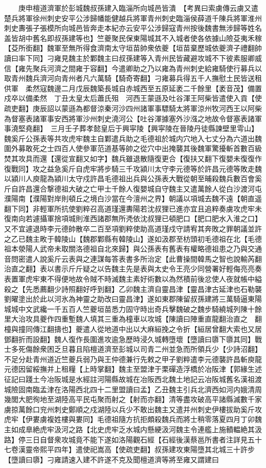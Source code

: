 　　庚申檀道濟軍於彭城魏叔孫建入臨淄所向城邑皆潰　【考異曰索虜傳云虜又遣楚兵將軍徐州刺史安平公涉歸幡能健越兵將軍青州刺史臨淄侯薛道千陳兵將軍淮州刺史夀張子張模所向城邑皆奔走本紀亦云安平公涉歸寇青州按後魏書無涉歸等姓名盖皆胡中舊名即叔孫建等也】竺夔聚民保東陽城其不入城者使各依據山險芟夷禾稼【芟所銜翻】魏軍至無所得食濟南太守垣苗帥衆依夔【垣苗棄歷城依夔濟子禮翻帥讀曰率下同】刁雍見魏主於鄴魏主曰叔孫建等入青州民皆藏避攻城不下彼素服卿威信【雍先聚兵河濟之間雍于容翻】今遣卿助之乃以雍為青州刺史給雍騎使行募兵以取青州魏兵濟河向青州者凡六萬騎【騎奇寄翻】刁雍募兵得五千人撫慰土民皆送租供軍　柔然寇魏邊二月戊辰魏築長城自赤城西至五原延袤二千餘里【袤音茂】備置戍卒以備柔然　丁丑太皇太后蕭氏殂　河西王蒙遜及吐谷渾王阿柴皆遣使入貢【使疏吏翻】庚辰詔以蒙遜為都督涼秦河沙四州諸軍事驃騎太將軍涼州牧河西王以阿柴為督塞表諸軍事安西將軍沙州刺史澆河公【吐谷渾據塞外沙漒之地故令督塞表諸軍事澆堅堯翻】　三月壬子葬孝懿皇后于興寜陵【興寜陵在晉陵丹徒縣諫壁里雩山】　魏奚斤公孫表等共攻虎牢魏主自鄴遣兵助之毛德祖於城内穴地入七丈分為六道出魏圍外募敢死之士四百人使參軍范道基等帥之從穴中出掩襲其後魏軍驚擾斬首數百級焚其攻具而還【還從宣翻又如字】魏兵雖退散隨復更合【復扶又翻下復嬰未復復作復戰同】攻之益急奚斤自虎牢將步騎三千攻潁川太守李元德等於許昌元德等敗走魏以潁川人庾龍為潁川太守戍許昌毛德祖出兵與公孫表大戰從朝至晡殺魏兵數百會奚斤自許昌還合撃德祖大破之亡甲士千餘人復嬰城自守魏主又遣萬餘人從白沙渡河屯濮陽南【濮陽對岸則頓丘之境白沙當在今澶州之界】朝議以項城去魏不遠【朝直遥翻下同】非輕軍所抗使劉粹召高道瑾還夀陽若沈叔狸已進亦宜且追粹奏虜攻虎牢未復南向若遽攝軍捨項城則淮西諸郡無所凴依沈叔狸已頓肥口【肥口肥水入淮之口】又不宜遽退時李元德帥散卒二百至項劉粹使助高道瑾戍守請宥其奔敗之罪朝議並許之乙已魏主畋于韓陵山【魏郡鄴縣有韓陵山】遂如汲郡至枋頭初毛德祖在北【毛德祖本滎陽人武帝未取關洛德祖自北來歸】與公孫表有舊表有權略德祖患之乃與交通音問密遣人說奚斤云表與之連謀每答表書多所治定【此曹操間韓馬之智也說輸芮翻治直之翻】表以書示斤斤疑之以告魏主先是表與太史令王亮少同營署好輕侮亮亮奏表置軍虎牢東不得便地故令賊不時滅魏主素好術數以為然積前後忿使人夜就帳中縊殺之【先悉薦翻少詩照翻好呼到翻】乙卯魏主濟自靈昌津【靈昌津古延津也石勒襲劉曜塗出於此以河氷為神靈之助改曰靈昌津】遂如東郡陳留叔孫建將三萬騎逼東陽城城中文武纔一千五百人竺夔垣苗悉力固守時出奇兵擊魏破之魏步騎繞城列陳十餘里大治攻具夔作四重塹魏人填其三重為橦車以攻城【陳讀曰陣重直龍翻治直之　翻橦與撞同傳江翻擣也】夔遣人從地道中出以大麻絙挽之令折【絙居曾翻大索也又居鄧翻折而設翻】魏人復作長圍進攻逾急歷時浸久城轉墮壞【墮讀曰隳下隳其同】戰士多死傷餘衆困乏旦暮且陷檀道濟至彭城以司青二州並急而所領兵少【少詩沼翻】不足分赴青州道近竺夔兵弱乃與王仲德兼行先敕之甲子劉粹遣李元德襲許昌斬庾龍元德因留綏撫并上租糧【上時掌翻】魏主至盟津于栗磾造浮橋於冶阪津【郭緣生述征記曰踐土今冶阪城是水經註河陽縣故城在冶阪西北魏土地記云冶阪城舊名漢祖渡城險固南臨孟津在洛陽西北四十二里盟讀曰孟】乙丑魏主引兵北濟西如河内娥清周幾閭大肥徇地至湖陸高平民屯聚而射之【射而亦翻】清等盡攻破高平諸縣滅數千家虜掠萬餘口兖州刺史鄭順之戍湖陸以兵少不敢出魏主又遣并州刺史伊樓拔助奚斤攻虎牢【伊婁虜複姓樓與婁同】毛德祖隨方抗拒頗殺魏兵而將士稍零落夏四月丁卯魏主如成臯絶虎牢汲河之路【北史虎牢乏水城内懸綆汲河魏主令連艦上施轒輼絶其汲路】停三日自督衆攻城竟不能下遂如洛陽觀石經【石經後漢蔡邕所書者注詳見五十七卷漢靈帝熙平四年】遣使祀嵩高【使疏吏翻】叔孫建攻東陽墮其北城三十許步【墮讀曰隳】刁雍請速入建不許遂不克及聞檀道濟等將至雍又謂建曰